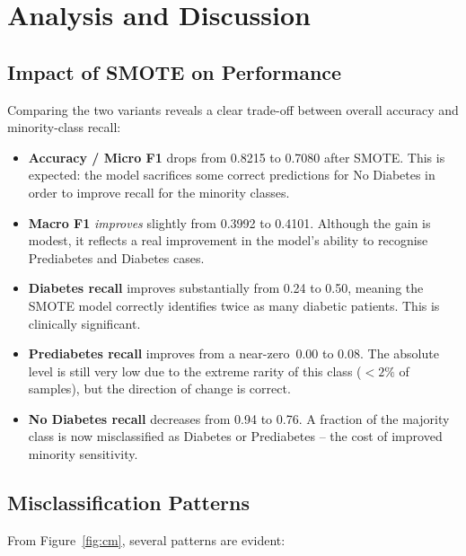 \documentclass[12pt,a4paper]{article}
\begin{document}
\section{Analysis and Discussion}

\subsection{Impact of SMOTE on Performance}

Comparing the two variants reveals a clear trade-off between overall accuracy and
minority-class recall:

\begin{itemize}
  \item \textbf{Accuracy / Micro F1} drops from 0.8215 to 0.7080 after SMOTE.
        This is expected: the model sacrifices some correct predictions for No
        Diabetes in order to improve recall for the minority classes.

  \item \textbf{Macro F1} \textit{improves} slightly from 0.3992 to 0.4101.
        Although the gain is modest, it reflects a real improvement in the model's
        ability to recognise Prediabetes and Diabetes cases.

  \item \textbf{Diabetes recall} improves substantially from 0.24 to 0.50, meaning
        the SMOTE model correctly identifies twice as many diabetic patients.
        This is clinically significant.

  \item \textbf{Prediabetes recall} improves from a near-zero~0.00 to 0.08.
        The absolute level is still very low due to the extreme rarity of this class
        ($<2\%$ of samples), but the direction of change is correct.

  \item \textbf{No Diabetes recall} decreases from 0.94 to 0.76.  
        A fraction of the majority class is now misclassified as Diabetes or
        Prediabetes -- the cost of improved minority sensitivity.
\end{itemize}

\subsection{Misclassification Patterns}

From Figure~\ref{fig:cm}, several patterns are evident:
\end{document}
